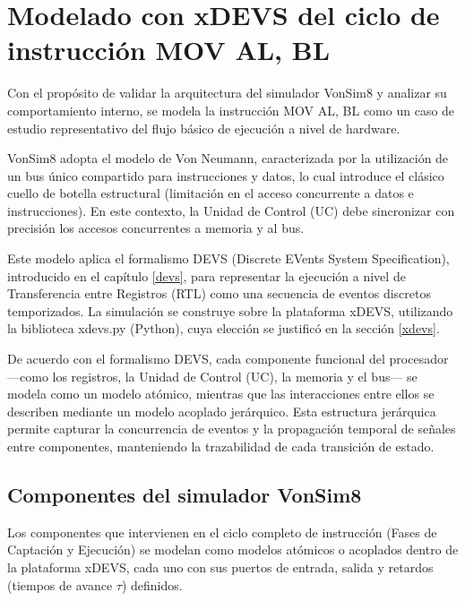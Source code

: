 \documentclass[12pt,oneside]{templates/unerthesis}
\begin{document}
\hypertarget{modelado-con-xdevs-del-ciclo-de-instrucciuxf3n-mov-al-bl}{%
\section{Modelado con xDEVS del ciclo de instrucción MOV AL, BL}\label{modelado-con-xdevs-del-ciclo-de-instrucciuxf3n-mov-al-bl}}

Con el propósito de validar la arquitectura del simulador VonSim8 y analizar su comportamiento interno, se modela la instrucción MOV AL, BL como un caso de estudio representativo del flujo básico de ejecución a nivel de hardware.

VonSim8 adopta el modelo de Von Neumann, caracterizada por la utilización de un bus único compartido para instrucciones y datos, lo cual introduce el clásico cuello de botella estructural (limitación en el acceso concurrente a datos e instrucciones). En este contexto, la Unidad de Control (UC) debe sincronizar con precisión los accesos concurrentes a memoria y al bus.

Este modelo aplica el formalismo DEVS (Discrete EVents System Specification), introducido en el capítulo \ref{devs}, para representar la ejecución a nivel de Transferencia entre Registros (RTL) como una secuencia de eventos discretos temporizados. La simulación se construye sobre la plataforma xDEVS, utilizando la biblioteca xdevs.py (Python), cuya elección se justificó en la sección \ref{xdevs}.

De acuerdo con el formalismo DEVS, cada componente funcional del procesador ---como los registros, la Unidad de Control (UC), la memoria y el bus--- se modela como un modelo atómico, mientras que las interacciones entre ellos se describen mediante un modelo acoplado jerárquico. Esta estructura jerárquica permite capturar la concurrencia de eventos y la propagación temporal de señales entre componentes, manteniendo la trazabilidad de cada transición de estado.

\hypertarget{componentes-del-simulador-vonsim8}{%
\subsection{Componentes del simulador VonSim8}\label{componentes-del-simulador-vonsim8}}

Los componentes que intervienen en el ciclo completo de instrucción (Fases de Captación y Ejecución) se modelan como modelos atómicos o acoplados dentro de la plataforma xDEVS, cada uno con sus puertos de entrada, salida y retardos (tiempos de avance \(\tau\)) definidos.
\end{document}
